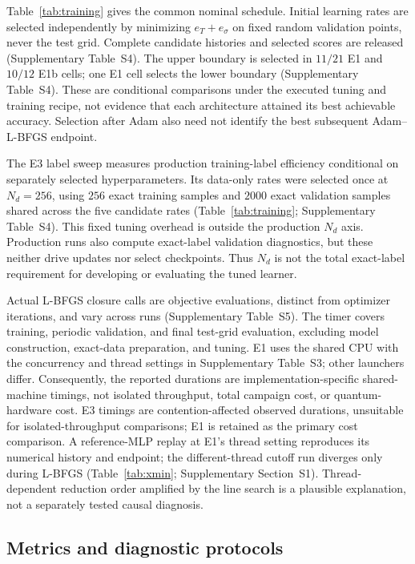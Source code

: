 \documentclass[11pt]{article}
\begin{document}
Table~\ref{tab:training} gives the common nominal schedule. Initial learning rates
are selected independently by minimizing $e_T+e_\sigma$ on fixed random
validation points, never the test grid. Complete candidate histories and
selected scores are released (Supplementary Table~S4). The upper boundary
is selected in $11/21$ E1 and $10/12$ E1b cells; one E1 cell selects the
lower boundary (Supplementary Table~S4). These are conditional comparisons
under the executed tuning and training recipe, not evidence that each
architecture attained its best achievable accuracy. Selection after Adam
also need not identify the best subsequent Adam--L-BFGS endpoint.

The E3 label sweep measures production training-label efficiency
conditional on separately selected hyperparameters. Its data-only rates
were selected once at $N_d=256$, using $256$ exact training samples and
$2000$ exact validation samples shared across the five candidate rates
(Table~\ref{tab:training}; Supplementary Table~S4). This fixed tuning
overhead is outside the production $N_d$ axis. Production runs also
compute exact-label validation diagnostics, but these neither drive
updates nor select checkpoints. Thus $N_d$ is not the total exact-label
requirement for developing or evaluating the tuned learner.

Actual L-BFGS closure calls are objective evaluations, distinct from
optimizer iterations, and vary across runs (Supplementary Table~S5).
The timer covers training, periodic validation, and final test-grid
evaluation, excluding model construction, exact-data preparation, and
tuning. E1 uses the shared CPU with the concurrency and thread settings
in Supplementary Table~S3; other launchers differ. Consequently, the
reported durations are implementation-specific shared-machine timings,
not isolated throughput, total campaign cost, or quantum-hardware cost.
E3 timings are contention-affected observed durations, unsuitable for
isolated-throughput comparisons; E1 is retained as the primary cost comparison.
A reference-MLP
replay at E1's thread setting reproduces its numerical history and endpoint;
the different-thread cutoff run diverges only during L-BFGS
(Table~\ref{tab:xmin}; Supplementary Section~S1). Thread-dependent
reduction order amplified by the line search is a plausible explanation,
not a separately tested causal diagnosis.

\subsection{Metrics and diagnostic protocols}
\end{document}
